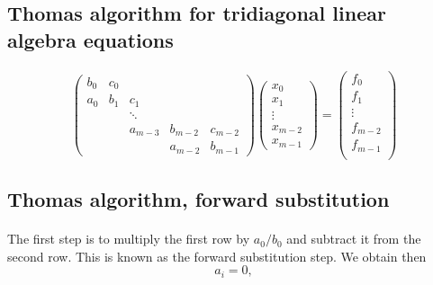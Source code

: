 \noindent
\subsection*{Thomas algorithm for tridiagonal linear algebra equations}

\paragraph{}
\[
\left( \begin{array}{ccccc}
        b_0 & c_0 &        &         &         \\
	a_0 &  b_1 &  c_1    &         &         \\
	   &    & \ddots  &         &         \\
	      &	    & a_{m-3} & b_{m-2} & c_{m-2} \\
	         &    &         & a_{m-2} & b_{m-1}
   \end{array} \right)
\left( \begin{array}{c}
       x_0     \\
       x_1     \\
       \vdots  \\
       x_{m-2} \\
       x_{m-1}
   \end{array} \right)=\left( \begin{array}{c}
       f_0     \\
       f_1     \\
       \vdots  \\
       f_{m-2} \\
       f_{m-1} \\
   \end{array} \right)
\]



\subsection*{Thomas algorithm, forward substitution}

\paragraph{}
The first step is to multiply the first row by $a_0/b_0$ and subtract it from the second row.  This is known as the forward substitution step. We obtain then
\[
	a_i = 0,
\]

